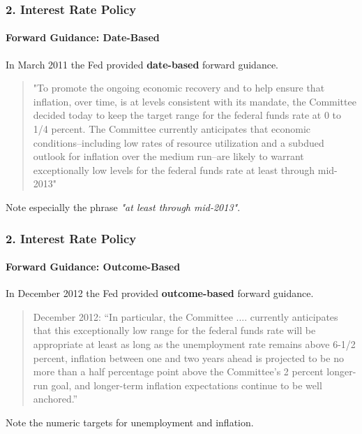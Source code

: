 \documentclass{beamer}
\begin{document}
\begin{frame}[t]
    \frametitle{2. Interest Rate Policy}
    \framesubtitle{Forward Guidance: Date-Based}

    In March 2011 the Fed provided \textbf{date-based} forward guidance.
    \vspace{1em}

    \begin{quote}
     "To promote the ongoing economic recovery and to help ensure that inflation, over time, is at levels consistent with its mandate, the Committee decided today to keep the target range for the federal funds rate at 0 to 1/4 percent.  The Committee currently anticipates that economic conditions--including low rates of resource utilization and a subdued outlook for inflation over the medium run--are likely to warrant exceptionally low levels for the federal funds rate at least through mid-2013"
    \end{quote}
    \vspace{1em}

    Note especially the phrase \textit{"at least through mid-2013"}.

\end{frame}

\begin{frame}[t]
    \frametitle{2. Interest Rate Policy}
    \framesubtitle{Forward Guidance: Outcome-Based}

    In December 2012 the Fed provided \textbf{outcome-based} forward guidance.
    \vspace{1em}

    \begin{quote}
    December 2012: “In particular, the Committee .... currently anticipates that this exceptionally low range for the federal funds rate will be appropriate at least as long as the unemployment rate remains above 6-1/2 percent, inflation between one and two years ahead is projected to be no more than a half percentage point above the Committee’s 2 percent longer-run goal, and longer-term inflation expectations continue to be well anchored.”
    \end{quote}
    \vspace{1em}

    Note the numeric targets for unemployment and inflation.

\end{frame}
\end{document}
